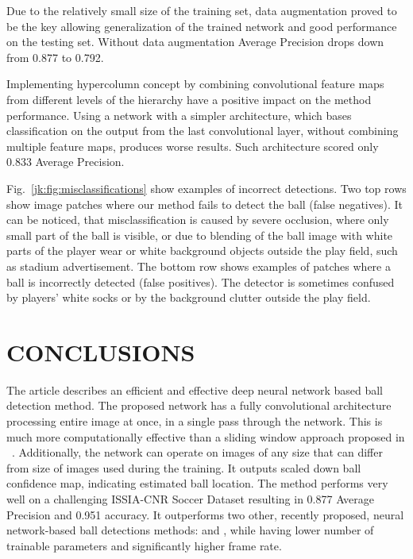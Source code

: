 \documentclass[a4paper,twoside]{article}
\begin{document}
Due to the relatively small size of the training set, data augmentation proved to be the key allowing generalization of the trained network and good performance on the testing set. Without data augmentation Average Precision drops down from 0.877 to 0.792.

Implementing hypercolumn concept by combining convolutional feature maps from different levels of the hierarchy have a positive impact on the method performance. Using a network with a simpler architecture, which bases classification on the output from the last convolutional layer, without combining multiple feature maps, produces worse results. Such architecture scored only 0.833 Average Precision. 

Fig.~\ref{jk:fig:misclassifications} show examples of incorrect detections. Two top rows show image patches where our method fails to detect the ball (false negatives). It can be noticed, that misclassification is caused by severe occlusion, where only small part of the ball is visible, or due to blending of the ball image with white parts of the player wear or white background objects outside the play field, such as stadium advertisement. The bottom row shows examples of patches where a ball is incorrectly detected (false positives). The detector is sometimes confused by players' white socks or by the background clutter outside the play field.



\section{\uppercase{Conclusions}}
\noindent

The article describes an efficient and effective deep neural network based ball detection method. 
The proposed network has a fully convolutional architecture processing entire image at once, in a single pass through the network. This is much more computationally effective than a sliding window approach proposed in ~\cite{Reno18}. Additionally, the network can operate on images of any size that can differ from size of images used during the training.
It outputs scaled down ball confidence map, indicating estimated ball location. The method performs very well on a challenging ISSIA-CNR Soccer Dataset \cite{DOr09} resulting in 0.877 Average Precision and 0.951 accuracy. 
It outperforms two other, recently proposed, neural network-based ball detections methods: \cite{Spec17} and \cite{Reno18}, while having lower number of trainable parameters and significantly higher frame rate.
\end{document}
